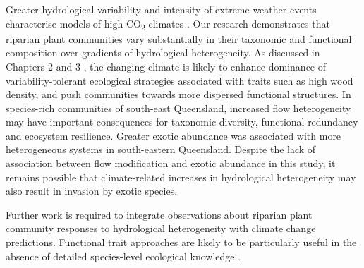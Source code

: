 \documentclass[openright,12pt,a4paper]{memoir}
\begin{document}
{{Greater hydrological variability and intensity of extreme weather events characterise models of high CO\textsubscript{2} climates \citep{Hennessy2008, stocker2013climate}. Our research demonstrates that riparian plant communities vary substantially in their taxonomic and functional composition over gradients of hydrological heterogeneity. As discussed in Chapters 2 and 3 \citep{Lawson2015, Lawson2015a}, the changing climate is likely to enhance dominance of variability-tolerant ecological strategies associated with traits such as high wood density, and push communities towards more dispersed functional structures. In species-rich communities of south-east Queensland, increased flow heterogeneity may have important consequences for taxonomic diversity, functional redundancy and ecosystem resilience. Greater exotic abundance was associated with more heterogeneous systems in south-eastern Queensland. Despite the lack of association between flow modification and exotic abundance in this study, it remains possible that climate-related increases in hydrological heterogeneity may also result in invasion by exotic species.

Further work is required to integrate observations about riparian plant community responses to hydrological heterogeneity with climate change predictions. Functional trait approaches are likely to be particularly useful in the absence of detailed species-level ecological knowledge \citep{Catford2012a}.

}}
\end{document}

